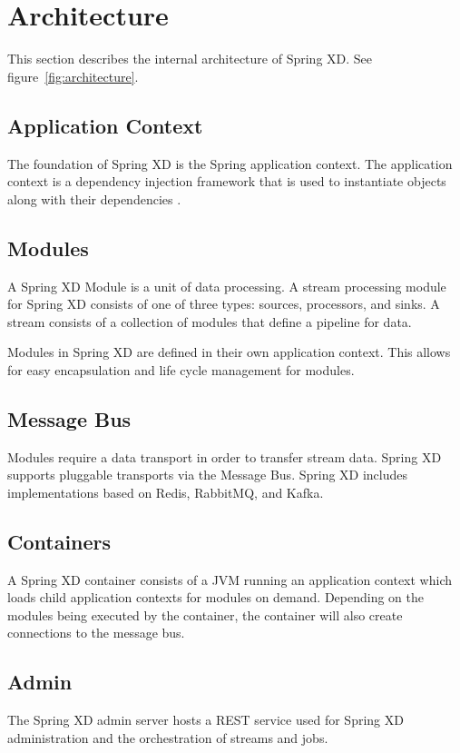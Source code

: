 \section{Architecture}
This section describes the internal architecture of Spring XD. See figure~\ref{fig:architecture}.

\subsection{Application Context}
The foundation of Spring XD is the Spring application context. The application context is a dependency injection framework that is used to instantiate objects along with their dependencies \cite{spring-framework-reference}. 

\subsection{Modules}
A Spring XD Module is a unit of data processing. A stream processing module for Spring XD consists of one of three types: sources, processors, and sinks. A stream consists of a collection of modules that define a pipeline for data.

Modules in Spring XD are defined in their own application context. This allows for easy encapsulation and life cycle management for modules.

\subsection{Message Bus}
Modules require a data transport in order to transfer stream data. Spring XD supports pluggable transports via the Message Bus. Spring XD includes implementations based on Redis, RabbitMQ, and Kafka.

\subsection{Containers}
A Spring XD container consists of a JVM running an application context which loads child application contexts for modules on demand. Depending on the modules being executed by the container, the container will also create connections to the message bus.

\subsection{Admin}
The Spring XD admin server hosts a REST service used for Spring XD administration and the orchestration of streams and jobs.

